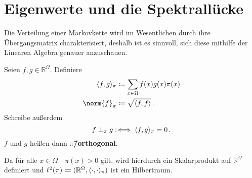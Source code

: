 \documentclass[ngerman,a4paper,11pt]{scrartcl}
\newcommand\coloniff{\vcentcolon\!\iff}
\newcommand{\RR}{\mathbb{R}}
\DeclarePairedDelimiter{\sprod}{\langle}{\rangle}	%
\begin{document}
\section{Eigenwerte und die Spektrallücke}
Die Verteilung einer Markovkette wird im Wesentlichen durch ihre Übergangsmatrix
charakterisiert, deshalb ist es sinnvoll, sich diese mithilfe der Linearen
Algebra genauer anzuschauen.

\begin{defn}
  Seien $f, g\in\RR^\Omega$. Definiere
  \begin{align*}
    \sprod{f,g}_\pi&\coloneqq\sum_{x\in\Omega}f(x)g(x)\pi(x) \\
    \norm{f}_\pi&\coloneqq\sqrt{\sprod{f,f}} \, .
  \end{align*}
 Schreibe außerdem
 \begin{equation*}
  f\perp_\pi g\coloniff\sprod{f,g}_\pi=0\, .
 \end{equation*}
 $f$ und $g$ heißen dann \textbf{$\pi$\=/orthogonal}.
\end{defn}

\begin{rem}
 Da für alle $x\in\Omega\quad\pi(x)>0$ gilt, wird hierdurch ein Skalarprodukt auf
 $\RR^\Omega$ definiert und $\ell^2(\pi)\coloneqq(\RR^\Omega,
 \sprod{\cdot,\cdot}_\pi)$ ist ein Hilbertraum.
\end{rem}
\end{document}

